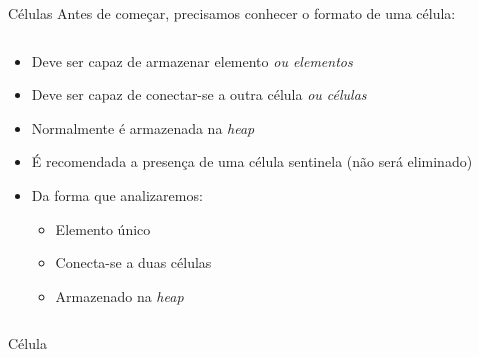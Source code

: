 \documentclass[14pt]{beamer}
\begin{document}
		\begin{frame}{Células}
			\presentationPause Antes de começar, precisamos conhecer o formato de uma célula:

			\begin{columns}
				\begin{column}{.6\textwidth}
					\begin{itemize}
						\presentationPause\item Deve ser capaz de armazenar elemento \presentationPause\textit{ou elementos}
						\presentationPause\item Deve ser capaz de conectar-se a outra célula \presentationPause\textit{ou células}
						\presentationPause\item Normalmente é armazenada na \textit{heap}
						\presentationPause\item É recomendada a presença de uma célula sentinela \presentationPause (não será eliminado)
						\presentationPause\item Da forma que analizaremos:
						\begin{itemize}
							\presentationPause\item Elemento único
							\presentationPause\item Conecta-se a duas células
							\presentationPause\item Armazenado na \textit{heap}
						\end{itemize}
					\end{itemize}
				\end{column}
				\begin{column}{.35\textwidth}
					\presentationPause
				\end{column}
			\end{columns}
		\end{frame}

		\begin{frame}{Célula}
			\begin{figure}[H]
				\centering
				
				\label{fig.cell}
			\end{figure}
		\end{frame}
\end{document}
